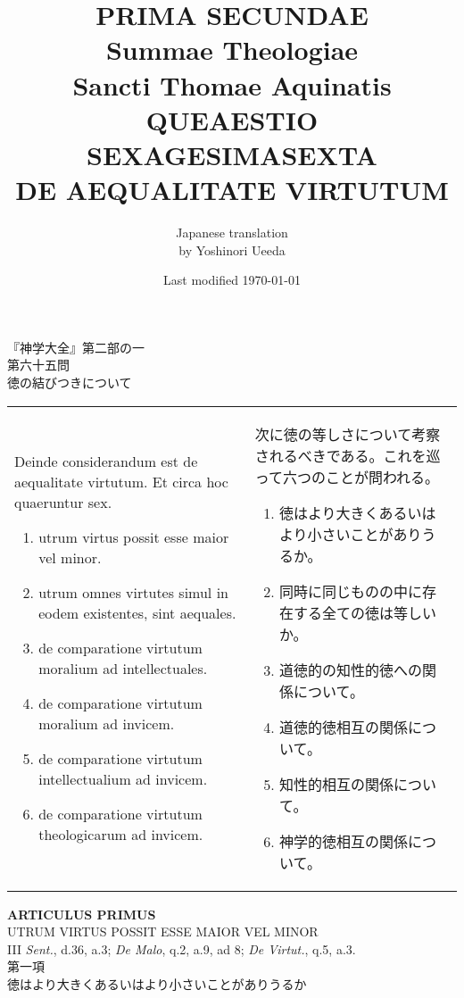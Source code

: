 \documentclass[10pt]{jsarticle}
\title{{\bf PRIMA SECUNDAE}\\{\HUGE Summae Theologiae}\\Sancti Thomae
Aquinatis\\{\sffamily QUEAESTIO SEXAGESIMASEXTA}\\DE AEQUALITATE VIRTUTUM}
\author{Japanese translation\\by Yoshinori {\sc Ueeda}}
\date{Last modified \today}
\begin{document}
\maketitle
\thispagestyle{empty}

\begin{center}
{\LARGE 『神学大全』第二部の一}\\
{\Large 第六十五問\\徳の結びつきについて}
\end{center}

\begin{longtable}{p{21em}p{21em}}

Deinde considerandum est de aequalitate virtutum. Et circa hoc
quaeruntur sex. 

\begin{enumerate}
 \item utrum virtus possit esse maior vel minor.
 \item utrum omnes virtutes simul in eodem existentes, sint aequales.
 \item de comparatione virtutum moralium ad intellectuales.
 \item de comparatione virtutum moralium ad invicem.
 \item de comparatione virtutum intellectualium ad invicem.
 \item de comparatione virtutum theologicarum ad invicem.
\end{enumerate}

&

次に徳の等しさについて考察されるべきである。これを巡って六つのことが問われる。

\begin{enumerate}
 \item 徳はより大きくあるいはより小さいことがありうるか。
 \item 同時に同じものの中に存在する全ての徳は等しいか。
 \item 道徳的の知性的徳への関係について。
 \item 道徳的徳相互の関係について。
 \item 知性的相互の関係について。
 \item 神学的徳相互の関係について。
\end{enumerate}
\end{longtable}

\newpage

\begin{center}
{\Large {\bf ARTICULUS PRIMUS}}\\
{\large UTRUM VIRTUS POSSIT ESSE MAIOR VEL MINOR}\\
{\footnotesize III {\itshape Sent.}, d.36, a.3; {\itshape De Malo}, q.2, a.9, ad 8; {\itshape De Virtut.}, q.5, a.3.}\\
{\Large 第一項\\徳はより大きくあるいはより小さいことがありうるか}
\end{center}
\end{document}
